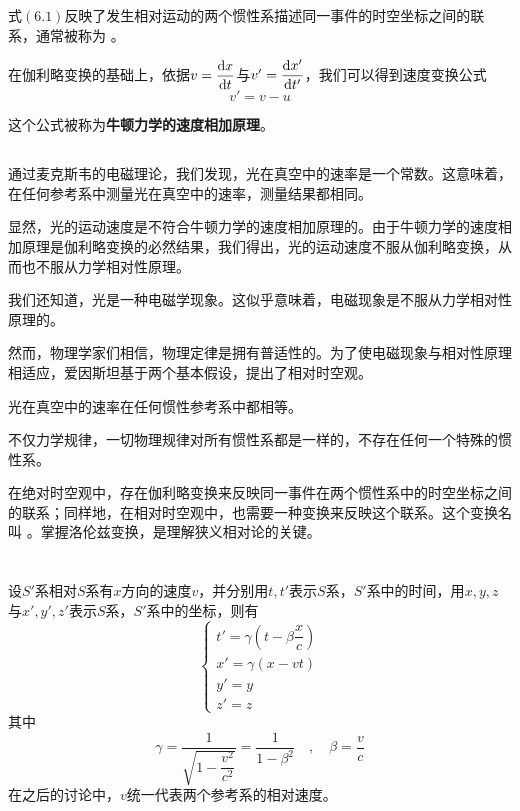式$(6.1)$反映了发生相对运动的两个惯性系描述同一事件的时空坐标之间的联系，通常被称为 。

在伽利略变换的基础上，依据$v=\dfrac{\dif x}{\dif t}$与$v'=\dfrac{\dif x'}{\dif t'}$，我们可以得到速度变换公式
\begin{equation}
    v'=v-u
\end{equation}

这个公式被称为\textbf{牛顿力学的速度相加原理}。

\subsection[相对时空观]{}
通过麦克斯韦的电磁理论，我们发现，光在真空中的速率是一个常数。这意味着，在任何参考系中测量光在真空中的速率，测量结果都相同。

显然，光的运动速度是不符合牛顿力学的速度相加原理的。由于牛顿力学的速度相加原理是伽利略变换的必然结果，我们得出，光的运动速度不服从伽利略变换，从而也不服从力学相对性原理。

我们还知道，光是一种电磁学现象。这似乎意味着，电磁现象是不服从力学相对性原理的。

然而，物理学家们相信，物理定律是拥有普适性的。为了使电磁现象与相对性原理相适应，爱因斯坦基于两个基本假设，提出了相对时空观。

\begin{Itemize}
    \item {} 光在真空中的速率在任何惯性参考系中都相等。
    \item {} 不仅力学规律，一切物理规律对所有惯性系都是一样的，不存在任何一个特殊的惯性系。
\end{Itemize}

在绝对时空观中，存在伽利略变换来反映同一事件在两个惯性系中的时空坐标之间的联系；同样地，在相对时空观中，也需要一种变换来反映这个联系。这个变换名叫 。掌握洛伦兹变换，是理解狭义相对论的关键。

\section[洛伦兹变换]{}
\begin {law}
设$S'$系相对$S$系有$x$方向的速度$v$，并分别用$t,t'$表示$S$系，$S'$系中的时间，用$x,y,z$与$x',y',z'$表示$S$系，$S'$系中的坐标，则有
\[\left\{\begin{array}{l}
        t'=\gamma(t-\beta\dfrac{x}{c}) \\
        x'=\gamma(x-vt)                \\
        y'=y                           \\
        z'=z
    \end{array}\right.\]
其中
\[
    \gamma=\dfrac{1}{\sqrt{1-\dfrac{v^2}{c^2}}} = \dfrac{1}{1-\beta^2}\quad,\quad\beta=\dfrac{v}{c}
\]
在之后的讨论中，$v$统一代表两个参考系的相对速度。
\end{law}

